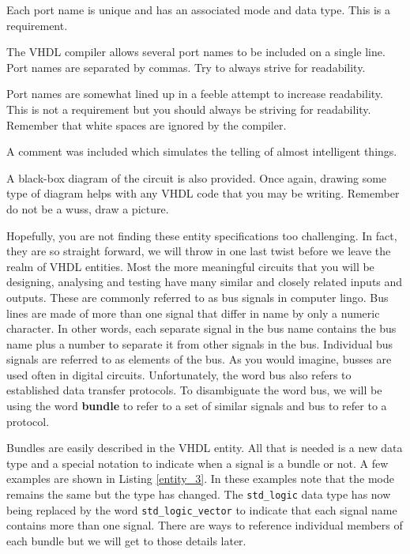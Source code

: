 \begin{my_list}
\item Each port name is unique and has an associated mode and data type. This is a requirement.
\item The VHDL compiler allows several port names to be included on a single line. Port names are separated by commas. Try to always strive for readability.
\item Port names are somewhat lined up in a feeble attempt to increase readability. This is not a requirement but you should always be striving for readability. Remember that white spaces are ignored by the compiler.
\item A comment was included which simulates the telling of almost intelligent things.
\item A black-box diagram of the circuit is also provided. Once again, drawing some type of diagram helps with any VHDL code that you may be writing. Remember do not be a wuss, draw a picture.
\end{my_list}

Hopefully, you are not finding these entity specifications too challenging. In fact, they are so straight forward, we will throw in one last twist before we leave the realm of VHDL entities. Most the more meaningful circuits that you will be designing, analysing and testing have many similar and closely related inputs and outputs. These are commonly referred to as bus signals in computer lingo. Bus lines are made of more than one signal that differ in name by only a numeric character. In other words, each separate signal in the bus name contains the bus name plus a number to separate it from other signals in the bus. Individual bus signals are referred to as elements of the bus. As you would imagine, busses are used often in digital circuits. Unfortunately, the word bus also refers to established data transfer protocols. To disambiguate the word bus, we will be using the word \textbf{bundle} to refer to a set of similar signals and bus to refer to a protocol.

Bundles are easily described in the VHDL entity. All that is needed is a new data type and a special notation to indicate when a signal is a bundle or not. A few examples are shown in Listing \ref{entity_3}. In these examples note that the mode remains the same but the type has changed. The \texttt{std\_logic} data type has now being replaced by the word \texttt{std\_logic\_vector} to indicate that each signal name contains more than one signal. There are ways to reference individual members of each bundle but we will get to those details later.

